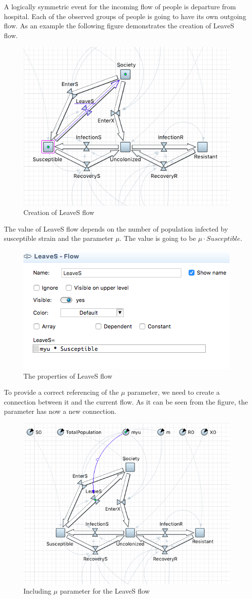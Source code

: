 A logically symmetric event for the incoming flow of people is departure from hospital. Each of the observed groups of people is going to have its own outgoing flow. As an example the following figure demonstrates the creation of LeaveS flow.

\begin{figure}[H]
  \centering
  \includegraphics[height=0.5\textwidth]{img/screens/society/society12}
  \caption{Creation of LeaveS flow}
\end{figure}

The value of LeaveS flow depends on the number of population infected by susceptible strain and the parameter $\mu$. The value is going to be $\mu \cdot Susceptible$.

\begin{figure}[H]
  \centering
  \includegraphics[height=0.3\textwidth]{img/screens/society/society18}
  \caption{The properties of LeaveS flow}
\end{figure}

To provide a correct referencing of the $\mu$ parameter, we need to create a connection between it and the current flow. As it can be seen from the figure, the parameter has now a new connection.

\begin{figure}[H]
  \centering
  \includegraphics[height=0.5\textwidth]{img/screens/society/society13}
  \caption{Including $\mu$ parameter for the LeaveS flow}
\end{figure}

